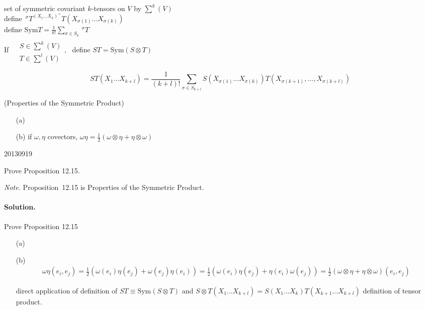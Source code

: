 set of symmetric covariant $k$-tensors on $V$ by $\sum^k(V)$ \\

define $\,^{\sigma}T^(X_1 \dots X_k)^ = T(X_{\sigma(1)} \dots X_{ \sigma(k)})$ \\

define $\text{Sym}T = \frac{1}{k!}  \sum_{\sigma \in S_k} \,^{\sigma}T$ \\

If $\begin{aligned} & \quad \\ 
  & S \in \sum^k(V) \\ 
  & T\in \sum^l(V) \end{aligned}$, \, define $ST = \text{Sym}{ (S\otimes T)}$

\[
ST(X_1 \dots X_{k+l}) = \frac{1}{ (k+l)!} \sum_{ \sigma \in S_{k+l} } S(X_{\sigma(1)} \dots X_{\sigma(k)} ) T(X_{\sigma(k+1)}, \dots , X_{\sigma(k+l) } )
\]

\begin{proposition}[12.15] (Properties of the Symmetric Product)
\begin{enumerate}
\item[(a)]
\item[(b)] if $\omega, \eta$ covectors, $ \omega \eta = \frac{1}{2} ( \omega \otimes \eta + \eta \otimes \omega)$
\end{enumerate}
\end{proposition}

20130919
\begin{exercise}
Prove Proposition 12.15.
\end{exercise}
\noindent\emph{Note.} Proposition~12.15 is Properties of the Symmetric Product.
\paragraph{Solution.} Prove Proposition 12.15

\begin{enumerate}
\item[(a)]
\item[(b)] \[
\begin{gathered}
  \omega \eta(e_i, e_j) = \frac{1}{2} ( \omega(e_i) \eta(e_j) + \omega(e_j) \eta(e_i)  ) = \frac{1}{2} ( \omega(e_i) \eta(e_j) + \eta(e_i) \omega(e_j)) = \frac{1}{2} ( \omega \otimes \eta + \eta \otimes \omega)(e_i ,e_j)
\end{gathered}
\]

direct application of definition of $ST \equiv \text{Sym}{(S\otimes T)}$ and $S\otimes T(X_1 \dots X_{k+l} ) = S(X_1 \dots X_k) T(X_{k+1} \dots X_{k+l})$ definition of tensor product.  

\end{enumerate}

